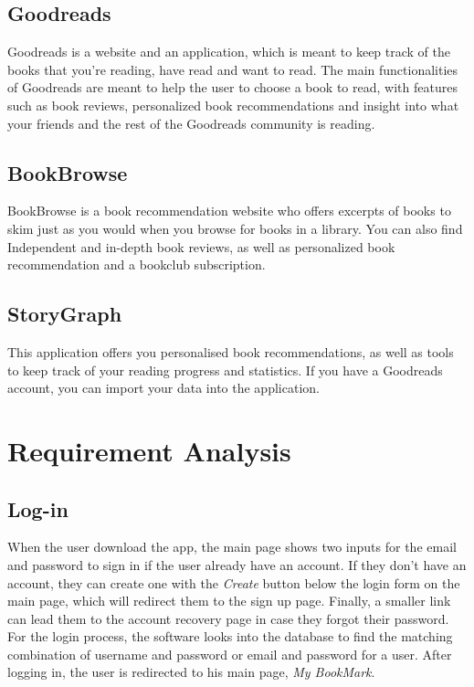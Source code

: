 \documentclass[conference]{IEEEtran}
\begin{document}
\subsection{Goodreads} 
Goodreads is a website and an application, which is meant to keep track of the books that you’re reading, have read and want to read. The main functionalities of Goodreads are meant to help the user to choose a book to read, with features such as book reviews, personalized book recommendations and insight into what your friends and the rest of the Goodreads community is reading. \cite{Goodreads}\\

\subsection{BookBrowse} 
BookBrowse is a book recommendation website who offers excerpts of books to skim just as you would when you browse for books in a library. You can also find Independent and in-depth book reviews, as well as personalized book recommendation and a bookclub subscription. \cite{Bookbrowse}\\

\subsection{StoryGraph} 
This application offers you personalised book recommendations, as well as tools to keep track of your reading progress and statistics. If you have a Goodreads account, you can import your data into the application. \cite{Storygraph} \\

\section{Requirement Analysis}

\subsection{Log-in}
When the user download the app, the main page shows two inputs for the email and password to sign in if the user already have an account. If they don't have an account, they can create one with the \textit{Create} button below the login form on the main page, which will redirect them to the sign up page. Finally, a smaller link can lead them to the account recovery page in case they forgot their password.\\
For the login process, the software looks into the database to find the matching combination of username and password or email and password for a user. After logging in, the user is redirected to his main page, \textit{My BookMark}.\\
\end{document}

